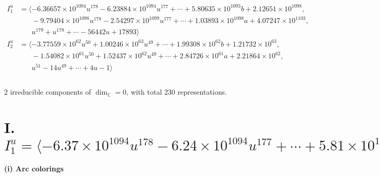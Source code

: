\documentclass[1p]{elsarticle_modified}
\theoremstyle{definition}
\begin{document}
\begin{align*}
I^u_{1}&=\langle 
-6.36657\times10^{1094} u^{178}-6.23884\times10^{1094} u^{177}+\cdots+5.80635\times10^{1093} b+2.12651\times10^{1098},\\
\phantom{I^u_{1}}&\phantom{= \langle  }-9.79404\times10^{1098} u^{178}-2.54297\times10^{1099} u^{177}+\cdots+1.03893\times10^{1098} a+4.07247\times10^{1103},\\
\phantom{I^u_{1}}&\phantom{= \langle  }u^{179}+u^{178}+\cdots-56442 u+17893\rangle \\
I^u_{2}&=\langle 
-3.77559\times10^{62} u^{50}+1.00246\times10^{63} u^{49}+\cdots+1.99308\times10^{62} b+1.21732\times10^{63},\\
\phantom{I^u_{2}}&\phantom{= \langle  }-1.54082\times10^{61} u^{50}+1.52437\times10^{62} u^{49}+\cdots+2.84726\times10^{61} a+2.21864\times10^{62},\\
\phantom{I^u_{2}}&\phantom{= \langle  }u^{51}-14 u^{49}+\cdots+4 u-1\rangle \\
\\
\end{align*}
\raggedright * 2 irreducible components of $\dim_{\mathbb{C}}=0$, with total 230 representations.\\
\newpage
\renewcommand{\arraystretch}{1}
\centering \section*{I. $I^u_{1}= \langle -6.37\times10^{1094} u^{178}-6.24\times10^{1094} u^{177}+\cdots+5.81\times10^{1093} b+2.13\times10^{1098},\;-9.79\times10^{1098} u^{178}-2.54\times10^{1099} u^{177}+\cdots+1.04\times10^{1098} a+4.07\times10^{1103},\;u^{179}+u^{178}+\cdots-56442 u+17893 \rangle$}
\flushleft \textbf{(i) Arc colorings}\\
\end{document}
